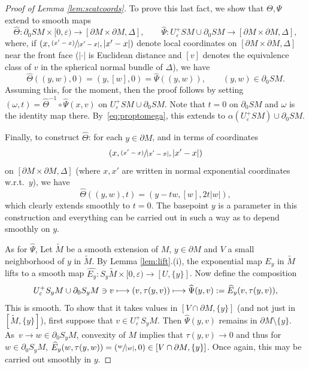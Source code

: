 \documentclass[11pt]{article}
\let\epsilon\varepsilon
\let\backslash\setminus
\newcommand{\psfrac}[2]{\sfrac{(#1)}{#2}}
\def\mto{\mathchoice{\longmapsto}{\mapsto}{\mapsto}{\mapsto}}
\theoremstyle{plain}
\theoremstyle{definition}
\theoremstyle{remark}
\newcommand{\del}{\partial}
\begin{document}
\begin{proof}[Proof of Lemma \ref{lem:scatcoords}]
To prove this last fact, we show that $\Theta,\Psi$ extend to smooth maps
\begin{equation*}
\widehat{\Theta} \colon \partial_0 SM \times [0,\varepsilon) \to [\partial M\times \partial M,\Delta], \qquad
\widehat{\Psi} \colon U_\varepsilon^+ SM \cup \partial_0 SM \to [\partial M\times \partial M,\Delta],
\end{equation*}
where, if $(x,\psfrac{x'-x}{|x'-x|},|x'-x|)$ denote local coordinates on $[\partial M\times \partial M,\Delta]$ near the front face
($|\cdot|$ is Euclidean distance and $[v]$ denotes the equivalence class of $v$ in the spherical normal bundle of $\Delta$), we have
\begin{equation*}
\widehat{\Theta}((y,w),0) = (y,[w],0) = \widehat{\Psi} ((y,w)), \qquad (y,w)\in \partial_0 SM.
\end{equation*}
Assuming this, for the moment, then the proof follows by setting $(\omega,t) = \widehat{\Theta}^{-1}\circ \widehat{\Psi} (x,v)$ on
$U_\varepsilon^+ SM \cup \del_0 SM$. Note that $t=0$ on $\partial_0 SM$ and $\omega$ is the identity map there. By~\eqref{eq:proptomega},
this extends to $\alpha(U_\epsilon^+ SM) \cup \del_0 SM$.

Finally, to construct $\widehat{\Theta}$: for each $y\in \partial M$, and in terms of coordinates
\begin{equation*}
(x,\psfrac{x'-x}{|x'-x|},|x'-x|)
\end{equation*}
on $[\partial M\times \partial M, \Delta]$ (where $x,x'$ are written in normal exponential coordinates w.r.t.~$y$), we have
\begin{equation*}
\widehat{\Theta}((y,w),t) = (y-tw, [w], 2t |w|),
\end{equation*}
which clearly extends smoothly to $t=0$. The basepoint $y$ is a parameter in this construction and everything can be carried out in such a way as to depend smoothly on $y$.

As for $\widehat{\Psi}$, Let $\widetilde{M}$ be a smooth extension of $M$, $y\in \partial M$ and $V$ a small neighborhood of $y$ in
$\widetilde{M}$. By Lemma \ref{lem:lift}.(i), the exponential map $E_y$ in $\widetilde{M}$ lifts to a smooth map $\widehat{E_y} \colon S_y \widetilde{M}\times [0,\varepsilon) \to [U,\{y\}]$. Now define the composition
\begin{equation*}
U_\varepsilon^+ S_y M \cup \partial_0 S_y M \ni v \mto (v, \tau(y,v)) \mto \widehat{\Psi}(y,v) := \widehat{E}_y (v, \tau(y,v)),
\end{equation*}
This is smooth. To show that it takes values in $[V\cap \partial M, \{y\}]$ (and not just in $[\widetilde M, \{y\}]$),
first suppose that $v\in U_\varepsilon^+ S_y M$. Then $\widehat{\Psi}(y,v)$ remains in $\partial M\backslash \{y\}$.
As~$v\to w \in \partial_0 S_y M$, convexity of $M$ implies that $\tau(y,v) \to 0$ and thus for $w\in \partial_0 S_y M$,
$\widehat{E}_y (w, \tau(y,w)) = (\sfrac{w}{|w|},0) \in [V\cap \partial M, \{y\}]$. Once again, this may be carried out
smoothly in $y$.
\end{proof}
\end{document}
